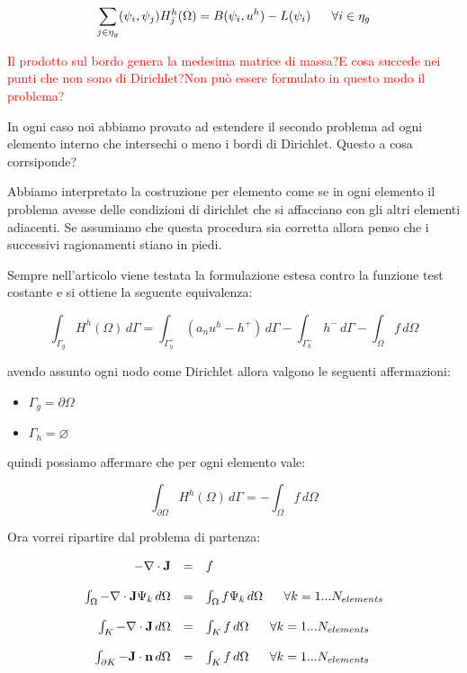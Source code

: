 \begin{equation}
\sum_{j\in \eta_g} (\psi_i,\psi_j)H^h_j(\Omega) = B(\psi_i,u^h)-L(\psi_i) \psp{10} \forall i \in \eta_g
\end{equation}

\textcolor{red}{Il prodotto sul bordo genera la medesima matrice di massa?E cosa succede nei punti che non sono di Dirichlet?Non può essere formulato in questo modo il problema?}

In ogni caso noi abbiamo provato ad estendere il secondo problema ad ogni elemento interno che intersechi o meno i bordi di Dirichlet.
Questo a cosa corrsiponde?

Abbiamo interpretato la costruzione per elemento come se in ogni elemento il problema avesse delle condizioni di dirichlet che si affacciano con gli altri elementi adiacenti.
Se assumiamo che questa procedura sia corretta allora penso che i successivi ragionamenti stiano in piedi.

Sempre nell'articolo viene testata la formulazione estesa contro la funzione test costante e si ottiene la seguente equivalenza:

\begin{equation}
\int_{\Gamma_g}H^h(\Omega) \, d\Gamma = \int_{\Gamma^+_h}(a_nu^h-h^+) \, d\Gamma - \int_{\Gamma_h^-}h^- \, d\Gamma - \int_\Omega f \, d\Omega
\end{equation}

avendo assunto ogni nodo come Dirichlet allora valgono le seguenti affermazioni:
\begin{itemize}
\item $\Gamma_g = \partial \Omega$
\item $\Gamma_h = \varnothing$
\end{itemize}

quindi possiamo affermare che per ogni elemento vale:

\begin{equation}
\int_{\partial\Omega}H^h(\Omega) \, d\Gamma =  - \int_\Omega f \, d\Omega
\end{equation}

Ora vorrei ripartire dal problema di partenza:

\begin{equation}
\begin{array}{rcl}
-\nabla \cdot \vect{J} & = & f \\
\\
\int_\Omega -\nabla \cdot \vect{J} \Psi_k \, d\Omega & = & 
\int_\Omega f \Psi_k \, d\Omega  \psp{10}  \forall k = 1 ... N_{elements}\\
\\
\int_K -\nabla \cdot \vect{J} \, d\Omega & = & \int_K f \, d\Omega  \psp{10}  \forall k = 1 ... N_{elements}\\
\\
\int_{\partial K} -\vect{J} \cdot \vect{n} \, d\Omega & = & \int_K f \, d\Omega  \psp{10}  \forall k = 1 ... N_{elements}\\

\end{array}
\end{equation}

